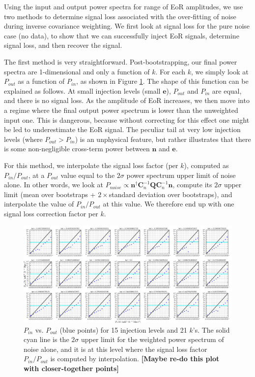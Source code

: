 \documentclass[preprint2,numberedappendix,tighten,twocolappendix]{aastex6}  %
\newcommand{\cc}[1]{{\color{purple} \textbf{[#1]}}}
\begin{document}
Using the input and output power spectra for range of EoR amplitudes, we use two methods to determine signal loss associated with the over-fitting of noise during inverse covariance weighting. We first look at signal loss for the pure noise case (no data), to show that we can successfully inject EoR signals, determine signal loss, and then recover the signal.

The first method is very straightforward. Post-bootstrapping, our final power spectra are 1-dimensional and only a function of $k$. For each $k$, we simply look at $P_{out}$ as a function of $P_{in}$, as shown in Figure \ref{fig:sigloss1_noise}. The shape of this function can be explained as follows. At small injection levels (small $\textbf{e}$), $P_{out}$ and $P_{in}$ are equal, and there is no signal loss. As the amplitude of EoR increases, we then move into a regime where the final output power spectrum is lower than the unweighted input one. This is dangerous, because without correcting for this effect one might be led to underestimate the EoR signal. The peculiar tail at very low injection levels (where $P_{out} > P_{in}$) is an unphysical feature, but rather illustrates that there is some non-negligible cross-term power between $\textbf{n}$ and $\textbf{e}$.

For this method, we interpolate the signal loss factor (per $k$), computed as $P_{in}/P_{out}$, at a $P_{out}$ value equal to the $2\sigma$ power spectrum upper limit of noise alone. In other words, we look at $P_{noise} \propto \textbf{n}^{\dagger}\textbf{C}_{n}^{-1}\textbf{Q}\textbf{C}_{n}^{-1}\textbf{n}$, compute its $2\sigma$ upper limit (mean over bootstraps + $2 \times $standard deviation over bootstraps), and interpolate the value of $P_{in}/P_{out}$ at this value. We therefore end up with one signal loss correction factor per $k$. 

\begin{figure}
	\centering
	\includegraphics[width=1.0\textwidth]{plots/sigloss1_noise.png}
	\caption{$P_{in}$ vs. $P_{out}$ (blue points) for 15 injection levels and 21 $k$'s. The solid cyan line is the $2\sigma$ upper limit for the weighted power spectrum of noise alone, and it is at this level where the signal loss factor $P_{in}/P_{out}$ is computed by interpolation. \cc{Maybe re-do this plot with closer-together points}}
	\label{fig:sigloss1_noise}
\end{figure}
\end{document}
